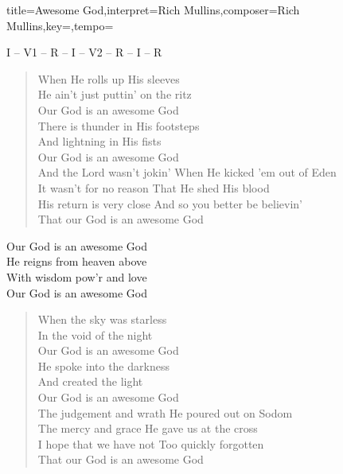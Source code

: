 \documentclass{leadsheet-modern}
\begin{document}
\begin{song}{title={Awesome God},interpret={Rich Mullins},composer={Rich Mullins},key={},tempo={}}

\begin{schedule}
I -- V1 -- R -- I -- V2 -- R -- I -- R
\end{schedule}

\begin{intro}
\end{intro}

\begin{verse}
When He rolls up His sleeves \\
He ain't just puttin' on the ritz \\
Our God is an awesome God \\
There is thunder in His footsteps \\
And lightning in His fists \\
Our God is an awesome God \\
And the Lord wasn't jokin' When He kicked 'em out of Eden \\
It wasn't for no reason That He shed His blood \\
His return is very close And so you better be believin' \\
That our God is an awesome God
\end{verse}

\begin{chorus}
Our God is an awesome God \\
He reigns from heaven above \\
With wisdom pow'r and love \\
Our God is an awesome God
\end{chorus}

\begin{verse}
When the sky was starless \\
In the void of the night \\
Our God is an awesome God \\
He spoke into the darkness \\
And created the light \\
Our God is an awesome God \\
The judgement and wrath He poured out on Sodom \\
The mercy and grace He gave us at the cross \\
I hope that we have not Too quickly forgotten \\
That our God is an awesome God
\end{verse}

\end{song}
\end{document}
